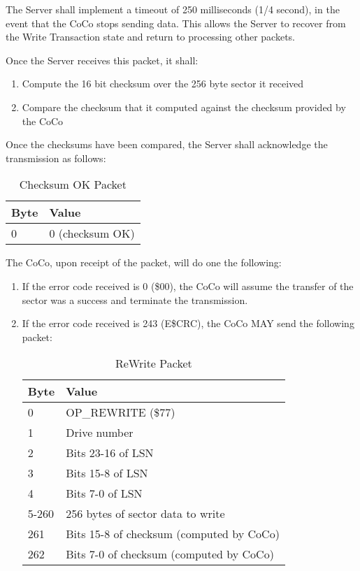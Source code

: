 \documentclass{article}
\begin{document}
The Server shall implement a timeout of 250 milliseconds (1/4 second), in the event that the CoCo stops sending data. This allows the Server to recover from the Write Transaction state and return to processing other packets.

Once the Server receives this packet, it shall:
\begin{enumerate}
\item Compute the 16 bit checksum over the 256 byte sector it received
\item Compare the checksum that it computed against the checksum provided by the CoCo
\end{enumerate}

Once the checksums have been compared, the Server shall acknowledge the transmission as follows:

\begin{table}[ht]
\caption{Checksum OK Packet}
\begin{center}
\begin{tabular}{|ll|}
\hline
Byte & Value \\ \hline
0 & 0 (checksum OK) \\
\hline
\end{tabular}
\end{center}
\end{table}

The CoCo, upon receipt of the packet, will do one the following:

\begin{enumerate}
\item If the error code received is 0 (\$00), the CoCo will assume the transfer of the sector was a success and terminate the transmission.
\item If the error code received is 243 (E\$CRC), the CoCo MAY send the following packet:

\begin{table}[ht]
\caption{ReWrite Packet}
\begin{center}
\begin{tabular}{|ll|}
\hline
Byte & Value \\ \hline
0 & OP\_REWRITE (\$77) \\
1 & Drive number \\
2 & Bits 23-16 of LSN \\
3 & Bits 15-8 of LSN \\
4 & Bits 7-0 of LSN \\
5-260 & 256 bytes of sector data to write \\
261 & Bits 15-8 of checksum (computed by CoCo) \\
262 & Bits 7-0 of checksum (computed by CoCo) \\
\hline
\end{tabular}
\end{center}
\end{table}

\end{enumerate}
\end{document}
